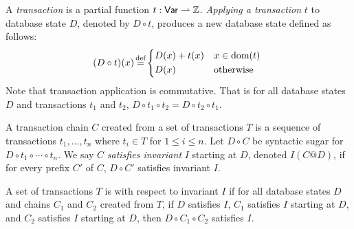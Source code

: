 A \emph{transaction} is a partial function $t: \textsf{Var} \rightharpoonup \mathbb{Z}$.
\emph{Applying a transaction} $t$ to database state $D$, denoted by $D \circ
t$, produces a new database state defined as follows:
\[
  (D \circ t)(x) \defeq \begin{cases*}
    D(x) + t(x) & $x \in \dom{}(t)$ \\
    D(x)        & otherwise
  \end{cases*}
\]
Note that transaction application is commutative. That is for all database
states $D$ and transactions $t_1$ and $t_2$, $D \circ t_1 \circ t_2 = D \circ
t_2 \circ t_1$.

A transaction chain $C$ created from a set of transactions $T$ is a sequence of
transactions $t_1, \ldots, t_n$ where $t_i \in T$ for $1 \leq i \leq n$. Let $D
\circ C$ be syntactic sugar for $D \circ t_1 \circ \cdots \circ t_n$. We say
$C$ \emph{satisfies invariant} $I$ starting at $D$, denoted $I(C @ D)$, if for
every prefix $C'$ of $C$, $D \circ C'$ satisfies invariant $I$.

A set of transactions $T$ is \iconfluent{} with respect to invariant $I$ if for
all database states $D$ and chains $C_1$ and $C_2$ created from $T$, if $D$
satisfies $I$, $C_1$ satisfies $I$ starting at $D$, and $C_2$ satisfies $I$
starting at $D$, then $D \circ C_1 \circ C_2$ satisfies $I$.


